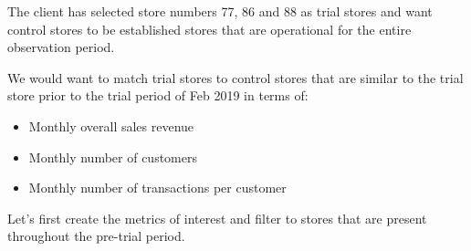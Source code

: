 \documentclass[]{article}
\providecommand{\tightlist}{%
  \setlength{\itemsep}{0pt}\setlength{\parskip}{0pt}}
\begin{document}
The client has selected store numbers 77, 86 and 88 as trial stores and
want control stores to be established stores that are operational for
the entire observation period.

We would want to match trial stores to control stores that are similar
to the trial store prior to the trial period of Feb 2019 in terms of:

\begin{itemize}
\tightlist
\item
  Monthly overall sales revenue
\item
  Monthly number of customers
\item
  Monthly number of transactions per customer
\end{itemize}

Let's first create the metrics of interest and filter to stores that are
present throughout the pre-trial period.
\end{document}
